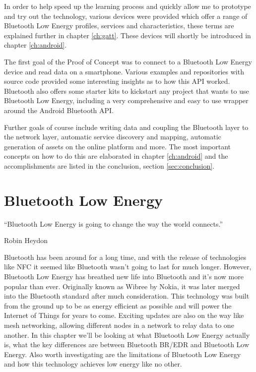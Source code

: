 \documentclass[pdftex,a4paper,12pt,twoside]{report}
\begin{document}
In order to help speed up the learning process and quickly allow me to prototype and try out the technology, various devices were provided which offer a range of Bluetooth Low Energy profiles, services and characteristics, these terms are explained further in chapter \ref{ch:gatt}. These devices will shortly be introduced in chapter \ref{ch:android}.

The first goal of the Proof of Concept was to connect to a Bluetooth Low Energy device and read data on a smartphone. Various examples and repositories with source code provided some interesting insights as to how this API worked. Bluetooth also offers some starter kits to kickstart any project that wants to use Bluetooth Low Energy, including a very comprehensive and easy to use wrapper around the Android Bluetooth API.

Further goals of course include writing data and coupling the Bluetooth layer to the network layer, automatic service discovery and mapping, automatic generation of assets on the online platform and more. The most important concepts on how to do this are elaborated in chapter \ref{ch:android} and the accomplishments are listed in the conclusion, section \ref{sec:conclusion}.




\chapter{Bluetooth Low Energy}
\label{ch:ble}
\epigraph{``Bluetooth Low Energy is going to change the way the world connects.''}{Robin Heydon}
Bluetooth has been around for a long time, and with the release of technologies like NFC it seemed like Bluetooth wasn't going to last for much longer. However, Bluetooth Low Energy has breathed new life into Bluetooth and it's now more popular than ever. Originally known as Wibree by Nokia, it was later merged into the Bluetooth standard after much consideration. This technology was built from the ground up to be as energy efficient as possible and will power the Internet of Things for years to come. Exciting updates are also on the way like mesh networking, allowing different nodes in a network to relay data to one another. In this chapter we'll be looking at what Bluetooth Low Energy actually is, what the key differences are between Bluetooth BR/EDR and Bluetooth Low Energy. Also worth investigating are the limitations of Bluetooth Low Energy and how this technology achieves low energy like no other.
\end{document}

